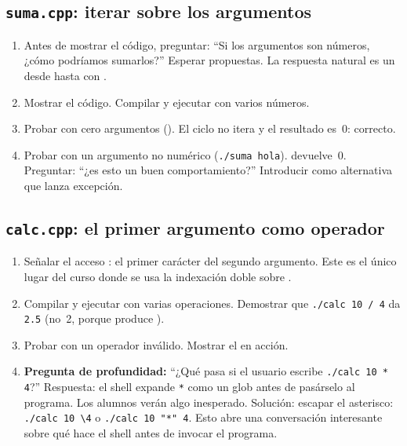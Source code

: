 \documentclass[12pt, oneside]{article}
\begin{document}
\subsection{\texttt{suma.cpp}: iterar sobre los argumentos}

\begin{notaprofesor}
  \begin{enumerate}
    \item Antes de mostrar el código, preguntar: ``Si los argumentos
          son números, ¿cómo podríamos sumarlos?''  Esperar propuestas.
          La respuesta natural es un  desde  hasta
           con .
    \item Mostrar el código.  Compilar y ejecutar con varios números.
    \item Probar con cero argumentos ().  El ciclo no
          itera y el resultado es~0: correcto.
    \item Probar con un argumento no numérico (\texttt{./suma hola}).
           devuelve~0.  Preguntar: ``¿es esto un
          buen comportamiento?''  Introducir  como alternativa
          que lanza excepción.
  \end{enumerate}
\end{notaprofesor}

\subsection{\texttt{calc.cpp}: el primer argumento como operador}

\begin{notaprofesor}
  \begin{enumerate}
    \item Señalar el acceso : el primer carácter del
          segundo argumento.  Este es el único lugar del curso donde
          se usa la indexación doble sobre .
    \item Compilar y ejecutar con varias operaciones.  Demostrar que
          \texttt{./calc 10 / 4} da \texttt{2.5} (no~2, porque
           produce ).
    \item Probar con un operador inválido.  Mostrar el 
          en acción.
    \item \textbf{Pregunta de profundidad:} ``¿Qué pasa si el usuario
          escribe \texttt{./calc 10 * 4}?''  Respuesta: el shell
          expande \texttt{*} como un glob antes de pasárselo al
          programa.  Los alumnos verán algo inesperado.  Solución:
          escapar el asterisco: \texttt{./calc 10 \textbackslash* 4}
          o \texttt{./calc 10 "*" 4}.  Esto abre una conversación
          interesante sobre qué hace el shell antes de invocar el
          programa.
  \end{enumerate}
\end{notaprofesor}
\end{document}

